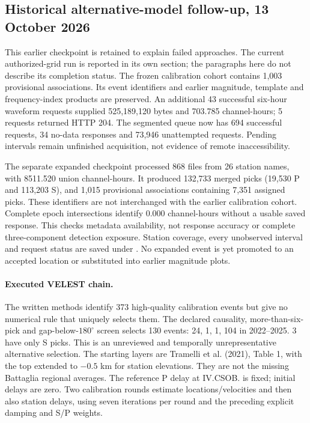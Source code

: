 \subsection*{Historical alternative-model follow-up, 13 October 2026}
This earlier checkpoint is retained to explain failed approaches. The current authorized-grid run is reported in its own section; the paragraphs here do not describe its completion status.
The frozen calibration cohort contains 1,003 provisional associations. Its event identifiers and earlier magnitude, template and frequency-index products are preserved. An additional 43 successful six-hour waveform requests supplied 525,189,120 bytes and 703.785 channel-hours; 5 requests returned HTTP 204. The segmented queue now has 694 successful requests, 34 no-data responses and 73,946 unattempted requests. Pending intervals remain unfinished acquisition, not evidence of remote inaccessibility.

The separate expanded checkpoint processed 868 files from 26 station names, with 8511.520 union channel-hours. It produced 132,733 merged picks (19,530 P and 113,203 S), and 1,015 provisional associations containing 7,351 assigned picks. These identifiers are not interchanged with the earlier calibration cohort. Complete epoch intersections identify 0.000 channel-hours without a usable saved response. This checks metadata availability, not response accuracy or complete three-component detection exposure. Station coverage, every unobserved interval and request status are saved under . No expanded event is yet promoted to an accepted location or substituted into earlier magnitude plots.

\paragraph{Executed VELEST chain.}
The written methods identify 373 high-quality calibration events but give no numerical rule that uniquely selects them. The declared causality, more-than-six-pick and gap-below-$180^\circ$ screen selects 130 events: 24, 1, 1, 104 in 2022--2025. 3 have only S picks. This is an unreviewed and temporally unrepresentative alternative selection. The starting layers are Tramelli et al. (2021), Table 1, with the top extended to $-0.5$ km for station elevations. They are not the missing Battaglia regional averages. The reference P delay at IV.CSOB. is fixed; initial delays are zero. Two calibration rounds estimate locations/velocities and then also station delays, using seven iterations per round and the preceding explicit damping and S/P weights.

